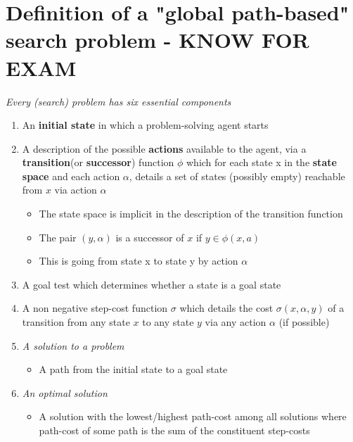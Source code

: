 \documentclass{article}[18pt]
\begin{document}
\section{Definition of a "global path-based" search problem - KNOW FOR EXAM}
\textit{Every (search) problem has six essential components}
\begin{enumerate}
	\item An \textbf{initial state} in which a problem-solving agent starts
	\item A description of the possible \textbf{actions} available to the agent, via a \textbf{transition}(or \textbf{successor}) function $\phi$ which for each state x in the \textbf{state space} and each action $\alpha$, details a set of states (possibly empty) reachable from $x$ via action $\alpha$
	\begin{itemize}
		\item The state space is implicit in the description of the transition function
		\item The pair $(y,\alpha)$ is a successor of $x$ if $y\in \phi(x,a)$
		\item This is going from state x to state y by action $\alpha$
	\end{itemize}
	\item A goal test which determines whether a state is a goal state
	\item A non negative step-cost function $\sigma$ which details the cost $\sigma (x,\alpha, y)$ of a transition from any state $x$ to any state $y$ via any action $\alpha$ (if possible)

\item \textit{A solution to a problem}
\begin{itemize}
	\item A path from the initial state to a goal state
\end{itemize}
\item \textit{An optimal solution}
\begin{itemize}
	\item A solution with the lowest/highest path-cost among all solutions where path-cost of some path is the sum of the constituent step-costs
\end{itemize}
\end{enumerate}
\end{document}
